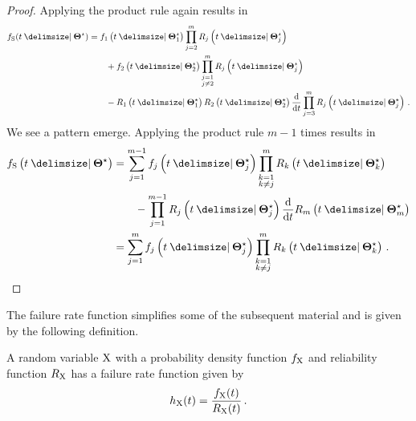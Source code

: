 \documentclass[
    11pt,
    extrafontsizes,
    article,
    oldfontcommands,
    final,
    oneside,
    openany,
    hidelinks]{memoir}
\begin{document}
\begin{proof}
Applying the product rule again results in
\begin{equation}
\begin{split}
    \spdf(t \Given \tparam\sysparam) &= \pdf_1\left(t \Given \tparam{\sysparam}_1\right) \prod_{\substack{j=2}}^{m} \srv_j\left(t \Given \tparam{\sysparam}_j\right)\\
    & \qquad + \pdf_2\left(t \Given \tparam{\sysparam}_2\right) \prod_{\substack{j=1\\j \neq 2}}^{m} \srv_j\left(t \Given \tparam{\sysparam}_j\right)\\
    & \qquad - \srv_1\left(t \Given \tparam{\sysparam}_1\right) \srv_2\left(t \Given \tparam{\sysparam}_2\right) \derivative{t} \prod_{j=3}^{m} \srv_j\left(t \Given \tparam{\sysparam}_j\right)\,.
\end{split}
\end{equation}
We see a pattern emerge. Applying the product rule $m-1$ times results in
\begin{align}
\begin{split}
    \spdf\left(t \Given \tparam\sysparam\right)
        &= \sum_{j=1}^{m-1} \pdf_j\left(t \Given \tparam{\sysparam}_j\right) \prod_{\substack{k=1\\k \neq j}}^{m} \srv_k\left(t \Given \tparam{\sysparam}_k \right)\\
        & \qquad - \prod_{j=1}^{m-1} \srv_j\left(t \Given \tparam{\sysparam}_j\right) \derivative{t} \srv_m\left(t \Given \tparam{\sysparam}_m\right)\\
        &= \sum_{j=1}^{m} \pdf_j\left(t \Given \tparam{\sysparam}_j\right) \prod_{\substack{k=1\\k \neq j}}^{m} \srv_k\left(t \Given \tparam{\sysparam}_k\right)\,.
\end{split}
\end{align}
\end{proof}

The failure rate function simplifies some of the subsequent material and is given by the following definition.
\begin{definition}
\label{def:failure_rate}
A random variable $\mathrm{X}$ with a probability density function $f_{\mathrm{X}}$ 
and reliability function $R_{\mathrm{X}}$ has a failure rate function given by
\begin{equation}
\label{eq:def_failure_rate}
    h_{\mathrm{X}}(t) = \frac{f_{\mathrm{X}}(t)}{R_{\mathrm{X}}(t)}\,.
\end{equation}
\end{definition}
\end{document}
